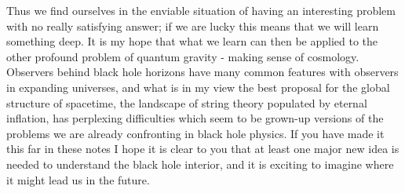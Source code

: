\documentclass[12pt]{article}
\begin{document}
Thus we find ourselves in the enviable situation of having an interesting problem with no really satisfying answer; if we are lucky this means that we will learn something deep.  It is my hope that what we learn can then be applied to the other profound problem of quantum gravity - making sense of cosmology.  Observers behind black hole horizons have many common features with observers in expanding universes, and what is in my view the best proposal for the global structure of spacetime, the landscape of string theory populated by eternal inflation, has perplexing difficulties which seem to be grown-up versions of the problems we are already confronting in black hole physics.  If you have made it this far in these notes I hope it is clear to you that at least one major new idea is needed to understand the black hole interior, and it is exciting to imagine where it might lead us in the future.  
\end{document}
